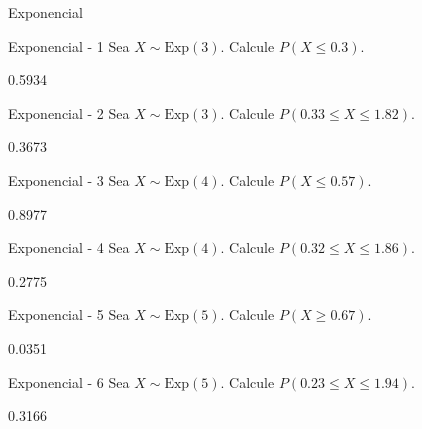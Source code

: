 \documentclass[a4,11pt]{aleph-notas}
\newcommand{\Exp}{\text{Exp}}
\begin{document}
\begin{quiz}{Exponencial}

\begin{numerical}[tolerance=0.01]%
    {Exponencial - 1}
    Sea \( X \sim \Exp(3) \). Calcule \( P(X \leq 0.3) \).
    \item[] 0.5934
\end{numerical}

\begin{numerical}[tolerance=0.01]%
    {Exponencial - 2}
    Sea \( X \sim \Exp(3) \). Calcule \( P(0.33 \leq X \leq 1.82) \).
    \item[] 0.3673
\end{numerical}

\begin{numerical}[tolerance=0.01]%
    {Exponencial - 3}
    Sea \( X \sim \Exp(4) \). Calcule \( P(X \leq 0.57) \).
    \item[] 0.8977
\end{numerical}

\begin{numerical}[tolerance=0.01]%
    {Exponencial - 4}
    Sea \( X \sim \Exp(4) \). Calcule \( P(0.32 \leq X \leq 1.86) \).
    \item[] 0.2775
\end{numerical}

\begin{numerical}[tolerance=0.01]%
    {Exponencial - 5}
    Sea \( X \sim \Exp(5) \). Calcule \( P(X \geq 0.67) \).
    \item[] 0.0351
\end{numerical}

\begin{numerical}[tolerance=0.01]%
    {Exponencial - 6}
    Sea \( X \sim \Exp(5) \). Calcule \( P(0.23 \leq X \leq 1.94) \).
    \item[] 0.3166
\end{numerical}


\end{quiz}
\end{document}
